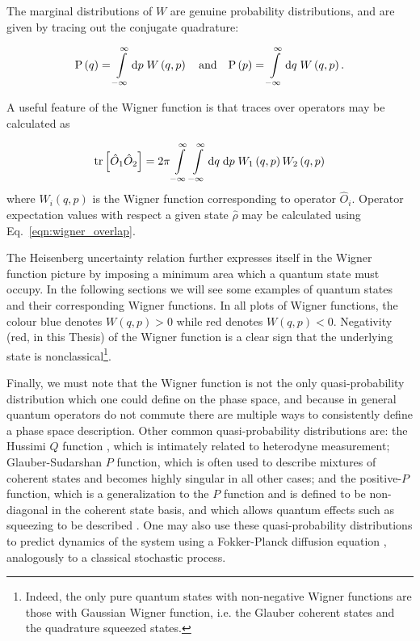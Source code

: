 \noindent The marginal distributions of $W$ are genuine probability distributions, and are given by tracing out the conjugate quadrature:

\begin{equation}
\text{P}\left(q\right) = \int\limits_{-\infty}^\infty \mathrm{d}p \; W\left(q, p\right) \qq{and} \text{P}\left(p\right) = \int\limits_{-\infty}^\infty \mathrm{d}q \; W\left(q, p\right).
\end{equation}

\noindent A useful feature of the Wigner function is that traces over operators may be calculated as

\begin{equation}\label{eqn:wigner_overlap}
\tr\left[\hat{O}_1 \hat{O}_2\right] = 2\pi \int\limits_{-\infty}^\infty \int\limits_{-\infty}^{\infty} \mathrm{d}q \; \mathrm{d}p \; W_1\left(q, p\right) W_2\left(q, p\right)
\end{equation}
where $W_i\left(q, p\right)$ is the Wigner function corresponding to operator $\hat{O}_i$. Operator expectation values with respect a given state $\hat{\rho}$ may be calculated using Eq.~\ref{eqn:wigner_overlap}. 

The Heisenberg uncertainty relation further expresses itself in the Wigner function picture by imposing a minimum area which a quantum state must occupy. In the following sections we will see some examples of quantum states and their corresponding Wigner functions. In all plots of Wigner functions, the colour blue denotes $W\left(q, p\right) >0$ while red denotes $W \left(q, p\right) <0$. Negativity (red, in this Thesis) of the Wigner function is a clear sign that the underlying state is nonclassical\footnote{Indeed, the only pure quantum states with non-negative Wigner functions are those with Gaussian Wigner function, i.e. the Glauber coherent states and the quadrature squeezed states.}.



Finally, we must note that the Wigner function is not the only quasi-probability distribution which one could define on the phase space, and because in general quantum operators do not commute there are multiple ways to consistently define a phase space description. Other common quasi-probability distributions are: the Hussimi $Q$ function \cite{Husimi1940}, which is intimately related to heterodyne measurement; Glauber-Sudarshan \cite{Glauber1963} $P$ function, which is often used to describe mixtures of coherent states and becomes highly singular in all other cases; and the positive-$P$ function, which is a generalization to the $P$ function and is defined to be non-diagonal in the coherent state basis, and which allows quantum effects such as squeezing to be described \cite{Walls_Millburn_Textbook}. One may also use these quasi-probability distributions to predict dynamics of the system using a Fokker-Planck diffusion equation \cite{Carmichael1999}, analogously to a classical stochastic process.

